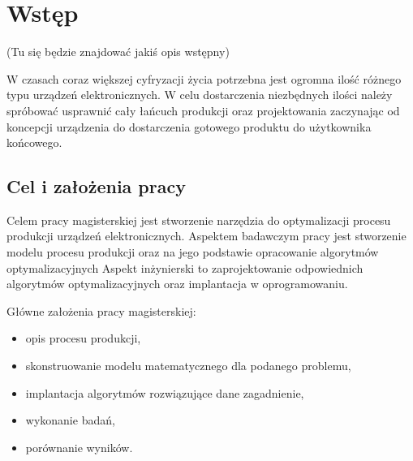 \chapter{Wstęp}

(Tu się będzie znajdować jakiś opis wstępny)

W czasach coraz większej cyfryzacji życia potrzebna jest ogromna ilość różnego typu urządzeń elektronicznych.
W celu dostarczenia niezbędnych ilości należy spróbować usprawnić cały łańcuch produkcji oraz projektowania zaczynając od koncepcji urządzenia do dostarczenia gotowego produktu do użytkownika końcowego.

\section{Cel i założenia pracy}
Celem pracy magisterskiej jest stworzenie narzędzia do optymalizacji procesu produkcji urządzeń elektronicznych.
Aspektem badawczym pracy jest stworzenie modelu procesu produkcji oraz na jego podstawie opracowanie algorytmów optymalizacyjnych
Aspekt inżynierski to zaprojektowanie odpowiednich algorytmów optymalizacyjnych oraz implantacja w oprogramowaniu.

Główne założenia pracy magisterskiej:
\begin{itemize}
    \item opis procesu produkcji,
    \item skonstruowanie modelu matematycznego dla podanego problemu,
    \item implantacja algorytmów rozwiązujące dane zagadnienie,
    \item wykonanie badań,
    \item porównanie wyników.
\end{itemize}
